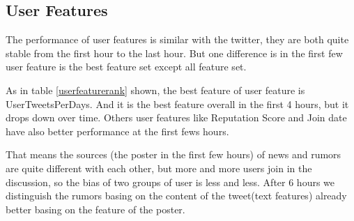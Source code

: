 \begin{table}[!h]
\centering
{}
\caption{Rank of Part of Twitter Feature}
\label{twitterfeaturerank}
\end{table}

\subsection{User Features} 
The performance of user features is similar with the twitter, they are both quite stable from the first hour to the last hour. But one difference is in the first few user feature is the best feature set except all feature set.

As in table \ref{userfeaturerank} shown, the best feature of user feature is UserTweetsPerDays. And it is the best feature overall in the first 4 hours, but it drops down over time. Others user features like Reputation Score and Join date have also better performance at the first fews hours. 

That means the sources (the poster in the first few hours) of news and rumors are quite different with each other, but more and more users join in the discussion, so the bias of two groups of user is less and less. After 6 hours we distinguish the rumors basing on the content of the tweet(text features) already better basing on the feature of the poster.
 
